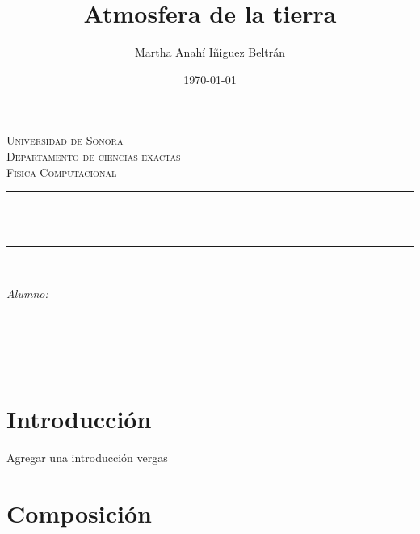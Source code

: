 \documentclass[12pt]{article}
\title{Atmosfera de la tierra}								%
\author{Martha Anahí Iñiguez Beltrán}						%
\date{\today}											%
\makeatletter
\let\thetitle\@title
\let\theauthor\@author
\let\thedate\@date
\makeatother
\begin{document}
\begin{titlepage}
\centering
    \vspace*{0.5 cm}
    \textsc{\LARGE Universidad de Sonora}\\[2.0 cm]	%
    \textsc{\Large Departamento de ciencias exactas}\\[1.0 cm]			
\textsc{\Large Física Computacional}\\[0.5 cm]			
\rule{\linewidth}{0.2 mm} \\[0.4 cm]
{ \huge \bfseries \thetitle}\\
\rule{\linewidth}{0.2 mm} \\[1.5 cm]
\begin{minipage}{0.6\textwidth}
\begin{flushleft} \large
\emph{Alumno:}\\
\theauthor
\end{flushleft}
\end{minipage}~
\begin{minipage}{0.4\textwidth}
\begin{flushright} \large
\end{flushright}
\end{minipage}\\[2 cm]


{\large \thedate}\\[2 cm]
 
\vfill

\end{titlepage}


\tableofcontents
\pagebreak


\section{Introducción}
\noindent

Agregar una introducción vergas

\section{Composición}
\end{document}
